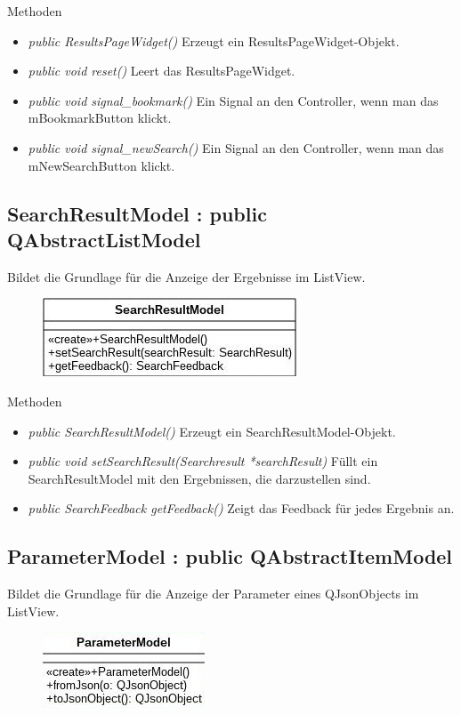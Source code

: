 Methoden
\begin{itemize}
	\item\textit{public ResultsPageWidget()}
	Erzeugt ein ResultsPageWidget-Objekt.
	\item\textit{public void reset()}
	Leert das ResultsPageWidget.
	\item\textit{public void signal\_bookmark()}
	Ein Signal an den Controller, wenn man das mBookmarkButton klickt.
	\item\textit{public void signal\_newSearch()}
	Ein Signal an den Controller, wenn man das mNewSearchButton klickt.
\end{itemize}

\subsection*{SearchResultModel : public QAbstractListModel}
Bildet die Grundlage für die Anzeige der Ergebnisse im ListView.

\begin{figure}[H]
	\centering
	\includegraphics[scale=0.5]{img/Klassendiagramm/Klassen/View/SearchResultModel}
	\label{fig:searchResultModel}
\end{figure}

Methoden
\begin{itemize}
	\item\textit{public SearchResultModel()}
	Erzeugt ein SearchResultModel-Objekt.
	\item\textit{public void setSearchResult(Searchresult *searchResult)}
	Füllt ein SearchResultModel mit den Ergebnissen, die darzustellen sind.
	\item\textit{public SearchFeedback getFeedback()}
	Zeigt das Feedback für jedes Ergebnis an.
\end{itemize}

\subsection*{ParameterModel : public QAbstractItemModel}
Bildet die Grundlage für die Anzeige der Parameter eines QJsonObjects im ListView.

\begin{figure}[H]
	\centering
	\includegraphics[scale=0.5]{img/Klassendiagramm/Klassen/View/ParameterModel}
	\label{fig:parameterModel}
\end{figure}

